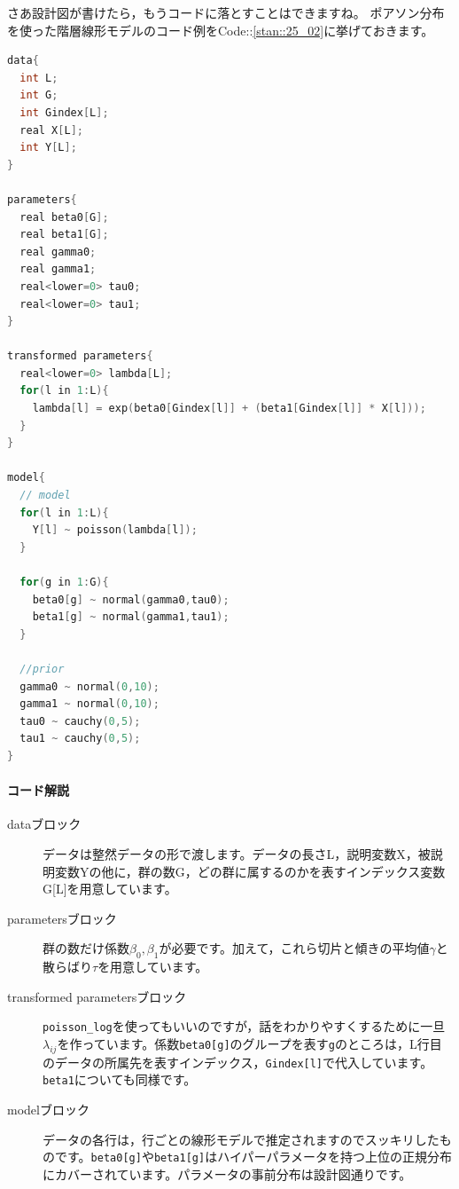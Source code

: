 \documentclass{ltjsbook}
\begin{document}
さあ設計図が書けたら，もうコードに落とすことはできますね。
ポアソン分布を使った階層線形モデルのコード例をCode::\ref{stan::25_02}に挙げておきます。

\begin{lstlisting}[language=C++,label={stan::25_02},caption={階層ポアソン回帰モデル}]
data{
  int L;
  int G;
  int Gindex[L];
  real X[L];
  int Y[L];
}

parameters{
  real beta0[G];
  real beta1[G];
  real gamma0;
  real gamma1;
  real<lower=0> tau0;
  real<lower=0> tau1;
}

transformed parameters{
  real<lower=0> lambda[L];
  for(l in 1:L){
    lambda[l] = exp(beta0[Gindex[l]] + (beta1[Gindex[l]] * X[l]));
  }
}

model{
  // model
  for(l in 1:L){
    Y[l] ~ poisson(lambda[l]);
  }
  
  for(g in 1:G){
    beta0[g] ~ normal(gamma0,tau0);
    beta1[g] ~ normal(gamma1,tau1);
  }
  
  //prior
  gamma0 ~ normal(0,10);
  gamma1 ~ normal(0,10);
  tau0 ~ cauchy(0,5);
  tau1 ~ cauchy(0,5);
}
\end{lstlisting}

\paragraph{コード解説}
\begin{description}
    \item[dataブロック] データは整然データの形で渡します。データの長さL，説明変数X，被説明変数Yの他に，群の数G，どの群に属するのかを表すインデックス変数G[L]を用意しています。 
    \item[parametersブロック] 群の数だけ係数$\beta_0,\beta_1$が必要です。加えて，これら切片と傾きの平均値$\gamma$と散らばり$\tau$を用意しています。
    \item[transformed parametersブロック] \verb|poisson_log|を使ってもいいのですが，話をわかりやすくするために一旦$\lambda_{ij}$を作っています。係数\verb|beta0[g]|のグループを表す\verb|g|のところは，L行目のデータの所属先を表すインデックス，\verb|Gindex[l]|で代入しています。\verb|beta1|についても同様です。
    \item[modelブロック] データの各行は，行ごとの線形モデルで推定されますのでスッキリしたものです。\verb|beta0[g]|や\verb|beta1[g]|はハイパーパラメータを持つ上位の正規分布にカバーされています。パラメータの事前分布は設計図通りです。
\end{description}
\end{document}
